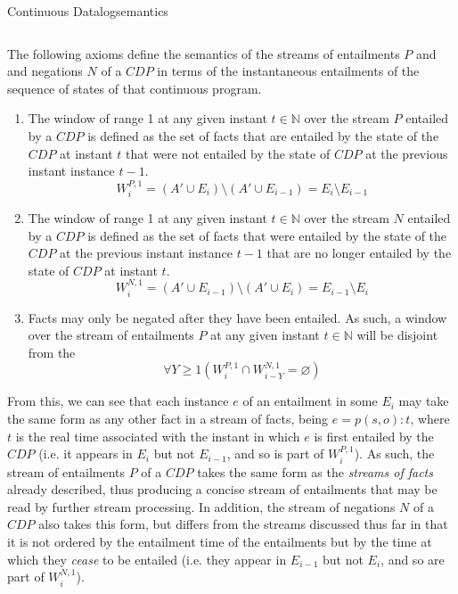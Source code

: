 \begin{nestedsection}{Continuous Datalog}{semantics}
\begin{description}
\begin{equation*}
			\end{equation*}
	\end{description}
	The following axioms define the semantics of the streams of entailments $P$ and and negations $N$ of a ${CDP}$ in terms of the instantaneous entailments of the sequence of states of that continuous program.
	\begin{enumerate}\setcounter{enumi}{\thecontinuousDatalogAxioms}
		\item\label{axiom:continuous datalog: positive window increment}
			The window of range 1 at any given instant ${t \in \mathbb{N}}$ over the stream $P$ entailed by a ${CDP}$ is defined as the set of facts that are entailed by the state of the ${CDP}$ at instant $t$ that were not entailed by the state of ${CDP}$ at the previous instant instance ${t-1}$.
			\begin{equation*}
				W^{P,1}_{i} = \left( A' \cup E_{i} \right) \setminus \left( A' \cup E_{i-1} \right) = E_{i} \setminus E_{i-1}
			\end{equation*}
		\item\label{axiom:continuous datalog: negative window increment}
			The window of range 1 at any given instant ${t \in \mathbb{N}}$ over the stream $N$ entailed by a ${CDP}$ is defined as the set of facts that were entailed by the state of the ${CDP}$ at the previous instant instance ${t-1}$ that are no longer entailed by the state of ${CDP}$ at instant $t$.
			\begin{equation*}
				W^{N,1}_{i} = \left( A' \cup E_{i-1} \right) \setminus \left( A' \cup E_{i} \right) = E_{i-1} \setminus E_{i}
			\end{equation*}
		\item\label{axiom:continuous datalog: entailment precedes negation}
			Facts may only be negated after they have been entailed.
			As such, a window over the stream of entailments $P$ at any given instant ${t \in \mathbb{N}}$ will be disjoint from the 
			\begin{equation*}
				\forall Y \geq 1 \left( W^{P,1}_{i} \cap W^{N,1}_{i-Y} = \varnothing \right)
			\end{equation*}
		\setcounter{continuousDatalogAxioms}{\theenumi}
	\end{enumerate}

	From this, we can see that each instance $e$ of an entailment in some $E_{i}$ may take the same form as any other fact in a stream of facts, being ${e = p(s,o):t}$, where $t$ is the real time associated with the instant in which $e$ is first entailed by the ${CDP}$ (i.e. it appears in $E_{i}$ but not $E_{i-1}$, and so is part of $W^{P,1}_{i}$).
	As such, the stream of entailments $P$ of a ${CDP}$ takes the same form as the \emph{streams of facts} already described, thus producing a concise stream of entailments that may be read by further stream processing.
	In addition, the stream of negations $N$ of a ${CDP}$ also takes this form, but differs from the streams discussed thus far in that it is not ordered by the entailment time of the entailments but by the time at which they \emph{cease} to be entailed (i.e. they appear in $E_{i-1}$ but not $E_{i}$, and so are part of $W^{N,1}_{i}$).


\end{nestedsection}
